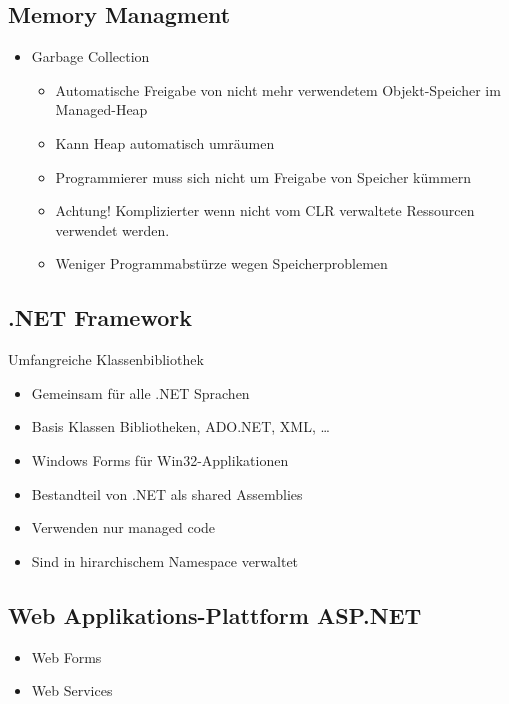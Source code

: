 \subsection{Memory Managment}
\begin{itemize}
	\item Garbage Collection
		\begin{itemize}
			\item Automatische Freigabe von nicht mehr verwendetem Objekt-Speicher im Managed-Heap
			\item Kann Heap automatisch umräumen
			\item Programmierer muss sich nicht um Freigabe von Speicher kümmern
			\item Achtung! Komplizierter wenn nicht vom CLR verwaltete Ressourcen verwendet werden.
			\item Weniger Programmabstürze wegen Speicherproblemen
		\end{itemize}
\end{itemize}

\subsection{.NET Framework}
Umfangreiche Klassenbibliothek
\begin{itemize}
	\item Gemeinsam für alle .NET Sprachen
	\item Basis Klassen Bibliotheken, ADO.NET, XML, \dots
	\item Windows Forms für Win32-Applikationen
	\item Bestandteil von .NET als shared Assemblies
	\item Verwenden nur managed code
	\item Sind in hirarchischem Namespace verwaltet
\end{itemize}

\subsection{Web Applikations-Plattform ASP.NET}
\begin{itemize}
	\item Web Forms
	\item Web Services
\end{itemize}
